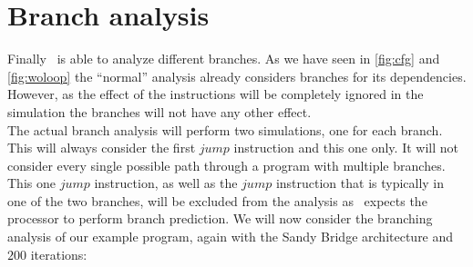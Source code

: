 \section{Branch analysis}

Finally \suaca\ is able to analyze different branches. As we have seen in \autoref{fig:cfg} and \autoref{fig:woloop} the ``normal'' analysis already considers branches for its dependencies. However, as the effect of the instructions will be completely ignored in the simulation the branches will not have any other effect.\\
The actual branch analysis will perform two simulations, one for each branch. This will always consider the first $jump$ instruction and this one only. It will not consider every single possible path through a program with multiple branches. This one $jump$ instruction, as well as the $jump$ instruction that is typically in one of the two branches, will be excluded from the analysis as \suaca\ expects the processor to perform branch prediction. We will now consider the branching analysis of our example program, again with the Sandy Bridge architecture and $200$ iterations:

